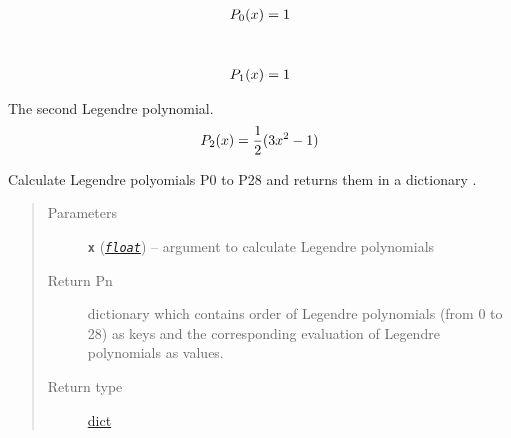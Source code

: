 \documentclass[a4paper,10pt,english]{sphinxmanual}
\begin{document}
\begin{fulllineitems}
\label{api/climlab.utils:climlab.utils.legendre.P0}~\begin{gather}
\begin{split}P_0 (x) = 1\end{split}\notag
\end{gather}
\end{fulllineitems}


\begin{fulllineitems}
\label{api/climlab.utils:climlab.utils.legendre.P1}~\begin{gather}
\begin{split}P_1 (x) = 1\end{split}\notag
\end{gather}
\end{fulllineitems}


\begin{fulllineitems}
\label{api/climlab.utils:climlab.utils.legendre.P2}
The second Legendre polynomial.
\begin{gather}
\begin{split}P_2(x) = \frac{1}{2} (3x^2 - 1)\end{split}\notag
\end{gather}
\end{fulllineitems}


\begin{fulllineitems}
\label{api/climlab.utils:climlab.utils.legendre.Pn}
Calculate Legendre polyomials P0 to P28 and returns them 
in a dictionary .
\begin{quote}\begin{description}
\item[{Parameters}] \leavevmode
\textbf{\texttt{x}} (\href{http://docs.python.org/2.7/library/functions.html\#float}{\emph{\texttt{float}}}) -- argument to calculate Legendre polynomials

\item[{Return Pn}] \leavevmode
dictionary which contains order of Legendre polynomials
(from 0 to 28) as keys and the corresponding evaluation
of Legendre polynomials as values.

\item[{Return type}] \leavevmode
\href{http://docs.python.org/2.7/library/stdtypes.html\#dict}{dict}

\end{description}\end{quote}

\end{fulllineitems}
\end{document}
